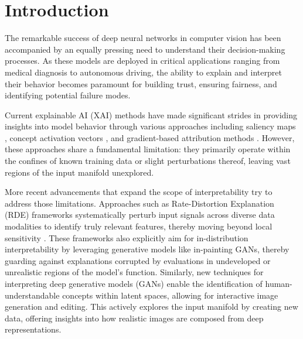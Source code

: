 
\chapter{Introduction}\label{r:introduction}

The remarkable success of deep neural networks in computer vision has been accompanied by an equally pressing need to understand their decision-making processes. As these models are deployed in critical applications ranging from medical diagnosis to autonomous driving, the ability to explain and interpret their behavior becomes paramount for building trust, ensuring fairness, and identifying potential failure modes.

Current explainable AI (XAI) methods have made significant strides in providing insights into model behavior through various approaches including saliency maps \citep{simonyan2014deepinsideconvolutionalnetworks}, concept activation vectors \citep{kim2018interpretabilityfeatureattributionquantitative}, and gradient-based attribution methods \citep{sundararajan2017axiomaticattributiondeepnetworks}. However, these approaches share a fundamental limitation: they primarily operate within the confines of known training data or slight perturbations thereof, leaving vast regions of the input manifold unexplored.

More recent advancements that expand the scope of interpretability try to address those limitations. Approaches such as Rate-Distortion Explanation (RDE) frameworks systematically perturb input signals across diverse data modalities to identify truly relevant features, thereby moving beyond local sensitivity \citep{Kolek2022}. These frameworks also explicitly aim for in-distribution interpretability by leveraging generative models like in-painting GANs, thereby guarding against explanations corrupted by evaluations in undeveloped or unrealistic regions of the model's function. Similarly, new techniques for interpreting deep generative models (GANs) enable the identification of human-understandable concepts within latent spaces, allowing for interactive image generation and editing. This actively explores the input manifold by creating new data, offering insights into how realistic images are composed from deep representations. \citep{zhou2022interpretinggenerativeadversarialnetworks, Karimi2022}

